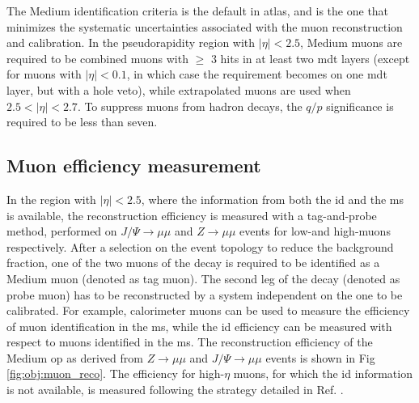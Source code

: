 The Medium identification criteria is the default in \gls{atlas}, and is the one that minimizes the systematic uncertainties associated with 
the muon reconstruction and calibration. In the pseudorapidity region with $|\eta|<2.5$, Medium muons are required to be combined muons with $\geq$ 3 hits in at least two \gls{mdt} layers (except for muons with $|\eta|<0.1$, in which case the requirement becomes on one \gls{mdt} layer, but with a hole veto), while extrapolated muons are used when $2.5<|\eta|<2.7$. To suppress muons from hadron decays, the $q/p$ significance is required to be less than seven. 

\subsection{Muon efficiency measurement}

In the region with $|\eta|<2.5$, where the information from both the \gls{id} and the \gls{ms} is available, 
the reconstruction efficiency is measured with a tag-and-probe method, performed on $J/\Psi \rightarrow \mu \mu$ and $Z\rightarrow \mu \mu$ events for low-\pt and high-\pt muons respectively. 
After a selection on the event topology to reduce the background fraction, one of the two muons of the decay is required to be identified 
as a Medium muon (denoted as tag muon). 
The second leg of the decay (denoted as probe muon) has to be reconstructed by a system independent on the one to be calibrated. For example, calorimeter muons can be used to measure the efficiency of muon identification in the \gls{ms}, while the \gls{id} efficiency can be measured with respect to muons identified in the \gls{ms}. 
The reconstruction efficiency of the Medium \gls{op} as derived from $Z\rightarrow \mu \mu$ and $J/\Psi \rightarrow \mu \mu$ events is shown in Fig \ref{fig:obj:muon_reco}.
The efficiency for high-$\eta$ muons, for which the \gls{id} information is not available, is measured following the strategy detailed in Ref. \cite{Aad:2014rra}.

